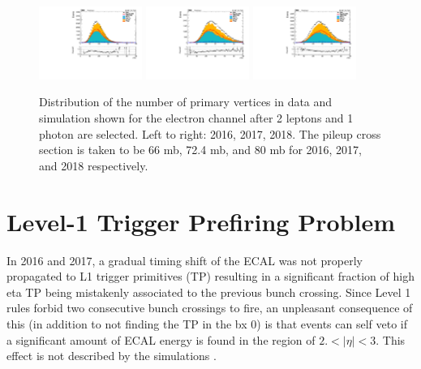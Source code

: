 \begin{figure}[hbtp]
  \begin{center}
     \includegraphics[width=0.3\textwidth]{fig/pileup/ele_kin_nVtx_valid_Legacy16_HLT.pdf}
     \includegraphics[width=0.3\textwidth]{fig/pileup/ele_kin_nVtx_valid_Rereco17_HLT.pdf}
     \includegraphics[width=0.3\textwidth]{fig/pileup/ele_kin_nVtx_valid_Rereco18_HLT.pdf}
  \end{center}
\caption{Distribution of the number of primary vertices in data and simulation shown for the electron channel after 2 leptons and 1 photon are selected. Left to right: 2016, 2017, 2018. The pileup cross section is taken to be 66 mb, 72.4 mb, and 80 mb for 2016, 2017, and 2018 respectively.}
\label{fig:puwei}
\end{figure}

\section{Level-1 Trigger Prefiring Problem}\label{sec:L1}
In 2016 and 2017, a gradual timing shift of the ECAL was not properly propagated to 
L1 trigger primitives (TP) resulting in a significant fraction of high eta TP 
being mistakenly associated to the previous bunch crossing. 
Since Level 1 rules forbid two consecutive bunch crossings to fire, 
an unpleasant consequence of this (in addition to not finding the TP in the bx 0) 
is that events can self veto if a significant amount of ECAL energy is found in the region 
of $2.<|\eta|<3$. This effect is not described by the simulations \cite{L1_prefire}.\\

